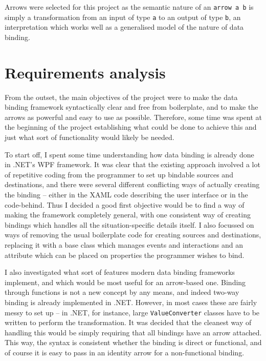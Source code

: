 \documentclass[12pt,twoside,notitlepage]{report}
\begin{document}
Arrows were selected for this project as the semantic nature of an \texttt{arrow a b} is simply a transformation from an input of type \texttt{a} to an output of type \texttt{b}, an interpretation which works well as a generalised model of the nature of data binding.

\section{Requirements analysis}

From the outset, the main objectives of the project were to make the data binding framework syntactically clear and free from boilerplate, and to make the arrows as powerful and easy to use as possible. Therefore, some time was spent at the beginning of the project establishing what could be done to achieve this and just what sort of functionality would likely be needed.

To start off, I spent some time understanding how data binding is already done in .NET's WPF framework. It was clear that the existing approach involved a lot of repetitive coding from the programmer to set up bindable sources and destinations, and there were several different conflicting ways of actually creating the binding -- either in the XAML code describing the user interface or in the code-behind. Thus I decided a good first objective would be to find a way of making the framework completely general, with one consistent way of creating bindings which handles all the situation-specific details itself. I also focussed on ways of removing the usual boilerplate code for creating sources and destinations, replacing it with a base class which manages events and interactions and an attribute which can be placed on properties the programmer wishes to bind.

I also investigated what sort of features modern data binding frameworks implement, and which would be most useful for an arrow-based one. Binding through functions is not a new concept by any means, and indeed two-way binding is already implemented in .NET. However, in most cases these are fairly messy to set up -- in .NET, for instance, large \texttt{ValueConverter} classes have to be written to perform the transformation. It was decided that the cleanest way of handling this would be simply requiring that all bindings have an arrow attached. This way, the syntax is consistent whether the binding is direct or functional, and of course it is easy to pass in an identity arrow for a non-functional binding.
\end{document}
